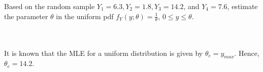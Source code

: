 Based on the random sample $Y_1=6.3, Y_2=1.8, Y_3=14.2$, and $Y_4=7.6$, estimate the parameter $\theta$
in the uniform pdf $f_Y(y;\theta)=\frac{1}{\theta}$, $0\leq y\leq\theta$.\\\\

\begin{solution}\renewcommand{\qedsymbol}{}\ \\
    It is known that the MLE for a uniform distribution is given by $\theta_e=y_{max}$. Hence,
    $\theta_e=14.2$.

\end{solution}